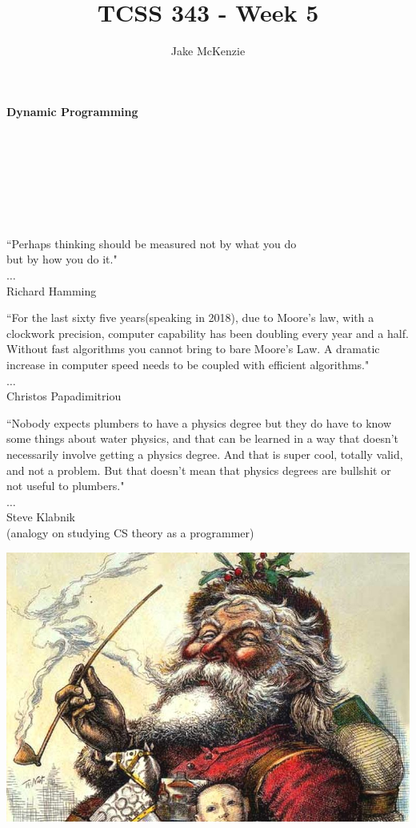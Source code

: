 \documentclass[12pt]{article}
\begin{document}
\title{TCSS 343 - Week 5}
\author{Jake McKenzie}
\maketitle
\noindent\centerline{\textbf{Dynamic Programming}}\\\\\\\\\\\\
\begin{center}
    ``Perhaps thinking should be measured not by what you do \\but by how you do it." \\$\dots$\\ Richard Hamming
\end{center}
\begin{center}
    ``For the last sixty five years(speaking in 2018), due to Moore's law, with a clockwork precision, computer capability has been doubling every year and a half. Without fast algorithms you cannot bring to bare Moore's Law. A dramatic increase in computer speed needs to be coupled with efficient algorithms." \\$\dots$\\ Christos Papadimitriou
\end{center}
\begin{center}
    ``Nobody expects plumbers to have a physics degree but they do have to know some things about water physics, and that can be learned in a way that doesn’t necessarily involve getting a physics degree. And that is super cool, totally valid, and not a problem. But that doesn’t mean that physics degrees are bullshit or not useful to plumbers." \\$\dots$\\ Steve Klabnik \\(analogy on studying CS theory as a programmer)
\end{center}
\newpage
\noindent\includegraphics[scale = .32]{santa.jpg}\\
\end{document}
